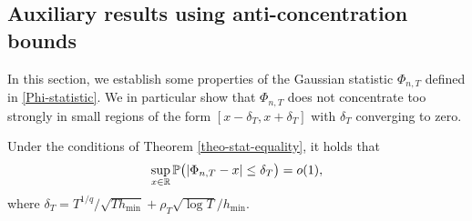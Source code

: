 \documentclass[a4paper,12pt]{article}
\begin{document}
\subsection*{Auxiliary results using anti-concentration bounds}


In this section, we establish some properties of the Gaussian statistic $\Phi_{n,T}$ defined in \eqref{Phi-statistic}. We in particular show that $\Phi_{n,T}$ does not concentrate too strongly in small regions of the form $[x-\delta_T,x+\delta_T]$ with $\delta_T$ converging to zero.  
%
%
\begin{propA}\label{propA-anticon-equality}
Under the conditions of Theorem \ref{theo-stat-equality}, it holds that 
\[ \sup_{x \in \mathbb{R}} \mathbb{P} \big( | \Phi_{n,T} - x | \le \delta_T \big) = o(1), \]
where $\delta_T = T^{1/q} / \sqrt{T h_{\min}} + \rho_T \sqrt{\log T}/ h_{\min}$.
\end{propA}
%
%
\end{document}

